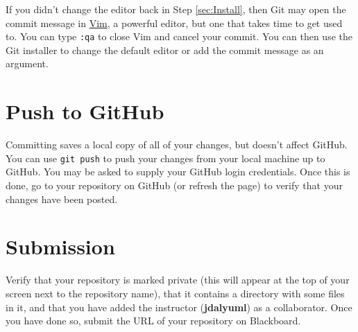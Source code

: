 \documentclass[12pt]{article}
\newcommand{\instructor}{jdalyuml}
\newcommand{\code}[1]{\texttt{#1}}
\begin{document}
If you didn't change the editor back in Step \ref{sec:Install}, then Git may open the commit message in \href{https://www.vim.org/}{Vim}, a powerful editor, but one that takes time to get used to.
You can type \code{:qa} to close Vim and cancel your commit.
You can then use the Git installer to change the default editor or add the commit message as an argument.

\section{Push to GitHub}

Committing saves a local copy of all of your changes, but doesn't affect GitHub.
You can use \code{git push} to push your changes from your local machine up to GitHub.
You may be asked to supply your GitHub login credentials.
Once this is done, go to your repository on GitHub (or refresh the page) to verify that your changes have been posted.

\section{Submission}\label{sec:Submission}

Verify that your repository is marked private (this will appear at the top of your screen next to the repository name), that it contains a directory with some files in it, and that you have added the instructor (\textbf{\instructor}) as a collaborator.
Once you have done so, submit the URL of your repository on Blackboard.
\end{document}
